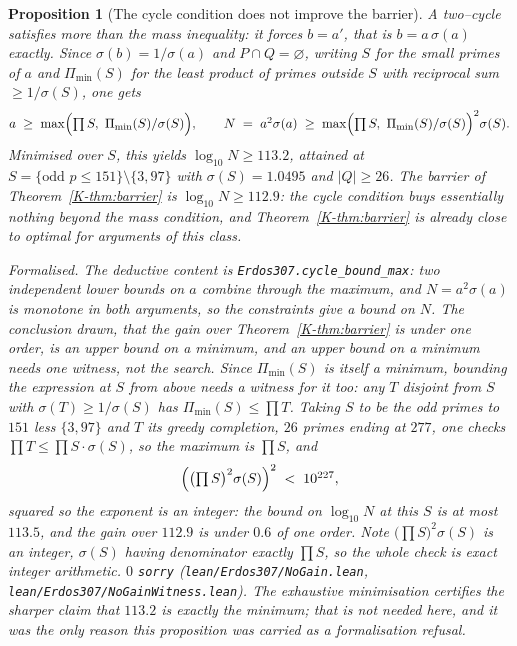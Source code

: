 \documentclass[11pt]{article}
\newtheorem{proposition}[theorem]{Proposition}
\theoremstyle{definition}
\begin{document}
\begin{proposition}[The cycle condition does not improve the barrier]\label{prop:nogain}
A two--cycle satisfies more than the mass inequality: it forces $b=a'$, that is $b=a\,\sigma(a)$
exactly. Since $\sigma(b)=1/\sigma(a)$ and $P\cap Q=\varnothing$, writing $S$ for the small primes of
$a$ and $\Pi_{\min}(S)$ for the least product of primes outside $S$ with reciprocal sum
$\ge1/\sigma(S)$, one gets
\[ a\;\ge\;\max\Bigl(\textstyle\prod S,\ \Pi_{\min}(S)/\sigma(S)\Bigr),\qquad
   N\;=\;a^2\sigma(a)\;\ge\;\max\Bigl(\textstyle\prod S,\ \Pi_{\min}(S)/\sigma(S)\Bigr)^2\sigma(S). \]
Minimised over $S$, this yields $\log_{10}N\ge113.2$, attained at
$S=\{\text{odd }p\le151\}\setminus\{3,97\}$ with $\sigma(S)=1.0495$ and $|Q|\ge26$. The barrier of
Theorem~\ref{K-thm:barrier} is $\log_{10}N\ge112.9$: \emph{the cycle condition buys essentially nothing
beyond the mass condition}, and Theorem~\ref{K-thm:barrier} is already close to optimal for arguments
of this class.

\textup{Formalised.} The deductive content is \texttt{Erdos307.cycle\_bound\_max}: two independent
lower bounds on $a$ combine through the maximum, and $N=a^2\sigma(a)$ is monotone in both arguments,
so the constraints give a bound on $N$. The conclusion drawn, that the gain over
Theorem~\ref{K-thm:barrier} is under one order, is an \emph{upper} bound on a minimum, and an upper
bound on a minimum needs one witness, not the search. Since $\Pi_{\min}(S)$ is itself a minimum,
bounding the expression at $S$ from above needs a witness for it too: any $T$ disjoint from $S$ with
$\sigma(T)\ge1/\sigma(S)$ has $\Pi_{\min}(S)\le\prod T$. Taking $S$ to be the odd primes to $151$
less $\{3,97\}$ and $T$ its greedy completion, $26$ primes ending at $277$, one checks
$\prod T\le\prod S\cdot\sigma(S)$, so the maximum is $\prod S$, and
\[ \Bigl(\bigl(\textstyle\prod S\bigr)^2\sigma(S)\Bigr)^{2}\;<\;10^{227}, \]
squared so the exponent is an integer: the bound on $\log_{10}N$ at this $S$ is at most $113.5$, and
the gain over $112.9$ is under $0.6$ of one order. Note $\bigl(\prod S\bigr)^2\sigma(S)$ is an
integer, $\sigma(S)$ having denominator exactly $\prod S$, so the whole check is exact integer
arithmetic. $0$ \texttt{sorry} \textup{(\texttt{lean/Erdos307/NoGain.lean},
\texttt{lean/Erdos307/NoGainWitness.lean})}. The exhaustive minimisation certifies the sharper claim
that $113.2$ is exactly the minimum; that is not needed here, and it was the only reason this
proposition was carried as a formalisation refusal.
\end{proposition}
\end{document}
